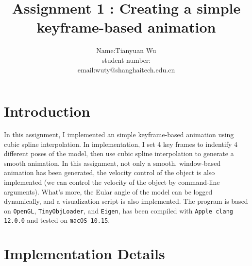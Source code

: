 \documentclass[acmtog]{acmart}
\title{Assignment 1 : Creating a simple keyframe-based animation}
\author{Name:\quad Tianyuan Wu \\ student number:\quad 63305667
	\\email:\quad wuty@shanghaitech.edu.cn}
\begin{document}
\maketitle

\vspace*{2 ex}


\section{Introduction}
In this assignment, I implemented an simple keyframe-based animation using cubic spline interpolation. 
In implementation, I set 4 key frames to indentify 4 different poses of the model, then use cubic 
spline interpolation to generate a smooth animation. In this assignment, not only a smooth, window-based 
animation has been generated, the velocity control of the object is also implemented (we can control 
the velocity of the object by command-line arguments). What's more, the Eular angle of the model can be 
logged dynamically, and a visualization script is also implemented. The program is based on \texttt{OpenGL}, 
\texttt{TinyObjLoader}, and \texttt{Eigen}, has been compiled with \texttt{Apple clang 12.0.0} and 
tested on \texttt{macOS 10.15}.

\section{Implementation Details}
\end{document}
